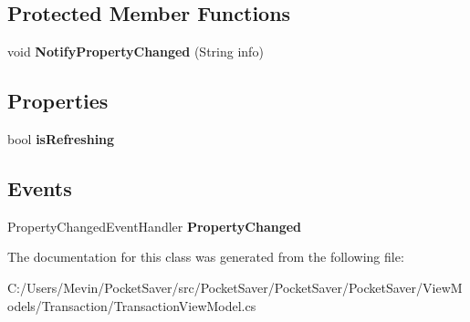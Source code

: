 \subsection*{Protected Member Functions}
\begin{DoxyCompactItemize}
\item 
\mbox{\label{class_pocket_saver_1_1_view_models_1_1_transaction_1_1_transaction_view_model_a322474d9390bb1c47b9b73f76e2aa519}} 
void {\bfseries Notify\+Property\+Changed} (String info)
\end{DoxyCompactItemize}
\subsection*{Properties}
\begin{DoxyCompactItemize}
\item 
\mbox{\label{class_pocket_saver_1_1_view_models_1_1_transaction_1_1_transaction_view_model_a05bc69b164fa7d830f71a76fbbc0aab3}} 
bool {\bfseries is\+Refreshing}
\end{DoxyCompactItemize}
\subsection*{Events}
\begin{DoxyCompactItemize}
\item 
\mbox{\label{class_pocket_saver_1_1_view_models_1_1_transaction_1_1_transaction_view_model_a258c2b7249a3e23d71d6669ef91d46bd}} 
Property\+Changed\+Event\+Handler {\bfseries Property\+Changed}
\end{DoxyCompactItemize}


The documentation for this class was generated from the following file\+:\begin{DoxyCompactItemize}
\item 
C\+:/\+Users/\+Mevin/\+Pocket\+Saver/src/\+Pocket\+Saver/\+Pocket\+Saver/\+Pocket\+Saver/\+View\+Models/\+Transaction/Transaction\+View\+Model.\+cs\end{DoxyCompactItemize}
